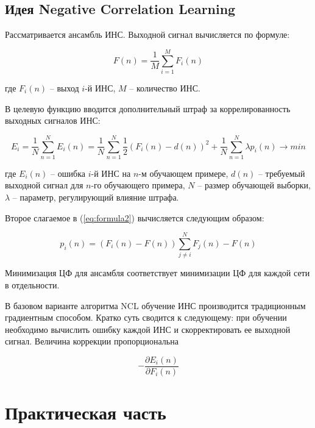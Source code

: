 \documentclass[12pt]{extarticle}
\begin{document}
\subsection{Идея Negative Correlation Learning}

Рассматривается ансамбль ИНС. Выходной сигнал вычисляется по формуле:

\begin{equation} \label{eq:formula1}
F(n) = \frac{1}{M}\sum_{i=1}^{M} F_i(n) 
\end{equation}

\noindent
где \(F_i(n)\) -- выход  \(i\)-й ИНС, \(M\) -- количество ИНС.

В целевую функцию вводится дополнительный штраф за коррелированность выходных сигналов ИНС:

\begin{equation} \label{eq:formula2}
E_i = \frac{1}{N}\sum_{n=1}^{N}E_i(n)=\frac{1}{N}\sum_{n=1}^{N}\frac{1}{2}(F_i(n)-d(n))^2 + \frac{1}{N}\sum_{n=1}^{N} \lambda p_i(n) \to min
\end{equation}

\noindent
где \(E_i(n)\) -- ошибка \(i\)-й ИНС на \(n\)-м обучающем примере, \(d(n)\) -- требуемый выходной сигнал для \(n\)-го обучающего примера, \(N\) -- размер обучающей выборки, \(\lambda\) -- параметр, регулирующий влияние штрафа.

Второе слагаемое в (\ref{eq:formula2}) вычисляется следующим образом:

\begin{equation} \label{eq:formula3}
p_i(n) = (F_i(n)-F(n))\sum_{j \neq i}^{N}F_j(n) - F(n)
\end{equation}

Минимизация ЦФ для ансамбля соответствует минимизации ЦФ для каждой сети в отдельности.

В базовом варианте алгоритма NCL обучение ИНС производится традиционным градиентным способом. Кратко суть сводится к следующему: при обучении необходимо вычислить ошибку каждой ИНС и скорректировать ее выходной сигнал. Величина коррекции пропорциональна

\begin{equation} \label{eq:formula4}
 - \frac{\partial E_i(n)}{\partial F_i(n)}
\end{equation}

\section{Практическая часть}
\end{document}
